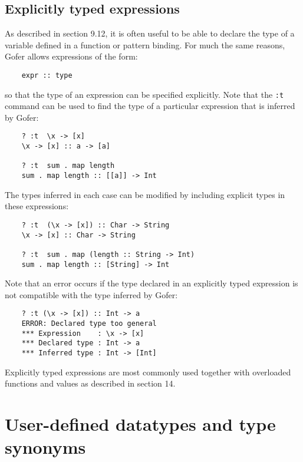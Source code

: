 \section{Explicitly typed expressions}
As described in section 9.12, it is often useful to be able to  declare
the type of a variable defined in a function or pattern  binding.   For
much the same reasons, Gofer allows expressions of the form:
\begin{verbatim}
    expr :: type
\end{verbatim}
so that the type of an expression can be  specified  explicitly.   Note
that the \verb":t" command can be used  to  find  the  type  of  a  particular
expression that is inferred by Gofer:
\begin{verbatim}
    ? :t  \x -> [x]
    \x -> [x] :: a -> [a]

    ? :t  sum . map length
    sum . map length :: [[a]] -> Int
\end{verbatim}
The types inferred in each case can be modified by  including  explicit
types in these expressions:
\begin{verbatim}
    ? :t  (\x -> [x]) :: Char -> String
    \x -> [x] :: Char -> String

    ? :t  sum . map (length :: String -> Int)
    sum . map length :: [String] -> Int
\end{verbatim}
Note that an error occurs if the type declared in an  explicitly  typed
expression is not compatible with the type inferred by Gofer:
\begin{verbatim}
    ? :t (\x -> [x]) :: Int -> a
    ERROR: Declared type too general
    *** Expression    : \x -> [x]
    *** Declared type : Int -> a
    *** Inferred type : Int -> [Int]
\end{verbatim}
Explicitly typed expressions  are  most  commonly  used  together  with
overloaded functions and values as described in section 14.


\chapter{User-defined datatypes and type synonyms}

